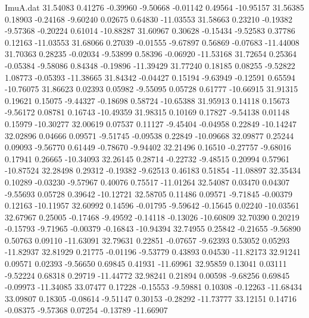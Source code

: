 \begin{filecontents}{ImuA.dat}
  31.54083    0.41276   -0.39960   -9.50668   -0.01142    0.49564  -10.95157
  31.56385    0.18903   -0.24168   -9.60240    0.02675    0.64830  -11.03553
  31.58663    0.23210   -0.19382   -9.57368   -0.20224    0.61014  -10.88287
  31.60967    0.30628   -0.15434   -9.52583    0.37786    0.12163  -11.03553
  31.68066    0.27039   -0.01555   -9.67897    0.56869   -0.07683  -11.44008
  31.70363    0.28235   -0.02034   -9.53899    0.58396   -0.06920  -11.53168
  31.72654    0.25364   -0.05384   -9.58086    0.84348   -0.19896  -11.39429
  31.77240    0.18185    0.08255   -9.52822    1.08773   -0.05393  -11.38665
  31.84342   -0.04427    0.15194   -9.63949   -0.12591    0.65594  -10.76075
  31.86623    0.02393    0.05982   -9.55095    0.05728    0.61777  -10.66915
  31.91315    0.19621    0.15075   -9.44327   -0.18698    0.58724  -10.65388
  31.95913    0.14118    0.15673   -9.56172    0.08781    0.16743  -10.49359
  31.98315    0.10169    0.17827   -9.54138    0.01148    0.15979  -10.30277
  32.00619    0.07537    0.11127   -9.45404   -0.04958    0.22849  -10.14247
  32.02896    0.04666    0.09571   -9.51745   -0.09538    0.22849  -10.09668
  32.09877    0.25244    0.09093   -9.56770    0.61449   -0.78670   -9.94402
  32.21496    0.16510   -0.27757   -9.68016    0.17941    0.26665  -10.34093
  32.26145    0.28714   -0.22732   -9.48515    0.20994    0.57961  -10.87524
  32.28498    0.29312   -0.19382   -9.62513    0.46183    0.51854  -11.08897
  32.35434    0.10289   -0.03230   -9.57967    0.40076    0.75517  -11.01264
  32.54087    0.03470    0.04307   -9.55693    0.05728    0.39642  -10.12721
  32.58705    0.11486    0.09571   -9.71845   -0.00379    0.12163  -10.11957
  32.60992    0.14596   -0.01795   -9.59642   -0.15645    0.02240  -10.03561
  32.67967    0.25005   -0.17468   -9.49592   -0.14118   -0.13026  -10.60809
  32.70390    0.20219   -0.15793   -9.71965   -0.00379   -0.16843  -10.94394
  32.74955    0.25842   -0.21655   -9.56890    0.50763    0.09110  -11.63091
  32.79631    0.22851   -0.07657   -9.62393    0.53052    0.05293  -11.82937
  32.81929    0.21775   -0.01196   -9.53779    0.43893    0.04530  -11.82173
  32.91241    0.09571    0.02393   -9.56650    0.69845    0.41931  -11.69961
  32.95859    0.13041    0.03111   -9.52224    0.68318    0.29719  -11.44772
  32.98241    0.21894    0.00598   -9.68256    0.69845   -0.09973  -11.34085
  33.07477    0.17228   -0.15553   -9.59881    0.10308   -0.12263  -11.68434
  33.09807    0.18305   -0.08614   -9.51147    0.30153   -0.28292  -11.73777
  33.12151    0.14716   -0.08375   -9.57368    0.07254   -0.13789  -11.66907

\end{filecontents}
